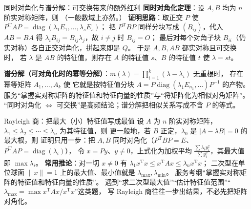 \begin{fdeep}{同时对角化与谱分解：可交换带来的额外红利}
\textbf{同时对角化定理}：设 $A,B$ 均为 $n$ 阶实对称矩阵，则
（一般数域上亦然。）
\textbf{证明思路}：取正交 $P$ 使
$P^{\mathrm T}AP=\operatorname{diag}(\lambda_1E_1,\dots,\lambda_sE_s)$；
把 $P^{\mathrm T}BP$ 同样分块写成 $(B_{ij})$，代入 $AB=BA$ 得
$\lambda_iB_{ij}=B_{ij}\lambda_j$，故 $i\ne j$ 时 $B_{ij}=O$；
最后对每个对角子块 $B_{ii}$（仍实对称）各自正交对角化，拼起来即是 $Q$。
于是 $A,B,AB$ 都实对称且可交换时，
若 $\lambda$ 是 $AB$ 的特征值，则存在 $A$ 的特征值 $s$、$B$ 的特征值 $t$ 使 $\lambda=st$。

\textbf{谱分解（可对角化时的幂等分解）}：$m(\lambda)=\prod_{i=1}^{k}(\lambda-\lambda_i)$ 无重根时，
存在幂等矩阵 $A_1,\dots,A_k$ 使
它就是按特征值分块 $A=P\operatorname{diag}(\lambda_1E_{n_1},\dots)P^{-1}$ 的产物。
\fbref{}服务“掌握实对称矩阵的特征值和特征向量的性质”与“将矩阵化为相似对角矩阵”。
“同时对角化 $\iff$ 可交换”是高频结论；谱分解把相似关系写成不含 $P$ 的等式。
\end{fdeep}

\begin{fdeep}{Rayleigh 商：把最大（小）特征值写成最值}
设 $A$ 为 $n$ 阶实对称矩阵，$\lambda_1\le\lambda_2\le\cdots\le\lambda_n$ 为其特征值，则
更一般地，若 $B$ 正定，$\lambda_0$ 是 $\lvert A-\lambda B\rvert=0$ 的最大根，则
证明只用一步：把 $A,B$ 同时对角化（$P^{\mathrm T}BP=E$、$P^{\mathrm T}AP=\operatorname{diag}(\lambda_i)$），
令 $x=Py$、$y\ne0$，上式化为加权平均
$\frac{\sum\lambda_iy_i^{2}}{\sum y_i^{2}}$，其最大值即 $\max\lambda_i$。
\textbf{常用推论}：对一切 $x\ne0$ 有 $\lambda_1x^{\mathrm T}x\le x^{\mathrm T}Ax\le\lambda_nx^{\mathrm T}x$；
二次型在单位球面 $\lVert x\rVert=1$ 上的最大值、最小值就是 $\lambda_{\max},\lambda_{\min}$。
\fbref{}服务考纲“掌握实对称矩阵的特征值和特征向量的性质”。
遇到“求二次型最大值”“估计特征值范围”“$\lambda_{\max}=\max x^{\mathrm T}Ax/x^{\mathrm T}x$”这类题，
写 Rayleigh 商往往一步出结果，不必先把矩阵对角化。
\end{fdeep}

